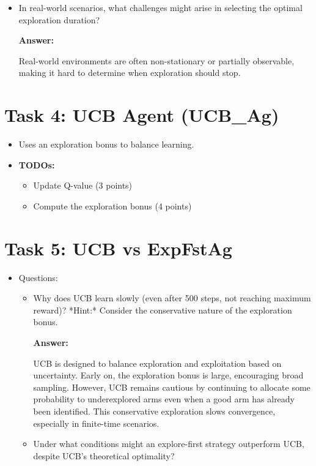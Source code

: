 \documentclass[12pt]{article}
\begin{document}
{{{\begin{itemize}[noitemsep]
\begin{itemize}[noitemsep]
        \item In real-world scenarios, what challenges might arise in selecting the optimal exploration duration?

        \textbf{Answer:}

        Real-world environments are often non-stationary or partially observable, making it hard to determine when exploration should stop.

    \end{itemize}
\end{itemize}

\section{Task 4: UCB Agent (UCB\_Ag)}
\begin{itemize}[noitemsep]
    \item Uses an exploration bonus to balance learning.
    \item \textbf{TODOs:}
    \begin{itemize}[noitemsep]
        \item Update Q-value (3 points)
        \item Compute the exploration bonus (4 points)
    \end{itemize}
\end{itemize}

\section{Task 5: UCB vs ExpFstAg}
\begin{itemize}
    \item Questions:
    \begin{itemize}
        \item Why does UCB learn slowly (even after 500 steps, not reaching maximum reward)?
        *Hint:* Consider the conservative nature of the exploration bonus.

        \textbf{Answer:}

        UCB is designed to balance exploration and exploitation based on uncertainty. Early on, the exploration bonus is large, encouraging broad sampling. However, UCB remains cautious by continuing to allocate some probability to underexplored arms even when a good arm has already been identified. This conservative exploration slows convergence, especially in finite-time scenarios.

        \item Under what conditions might an explore-first strategy outperform UCB, despite UCB’s theoretical optimality?


\end{itemize}
\end{itemize}}}}
\end{document}

